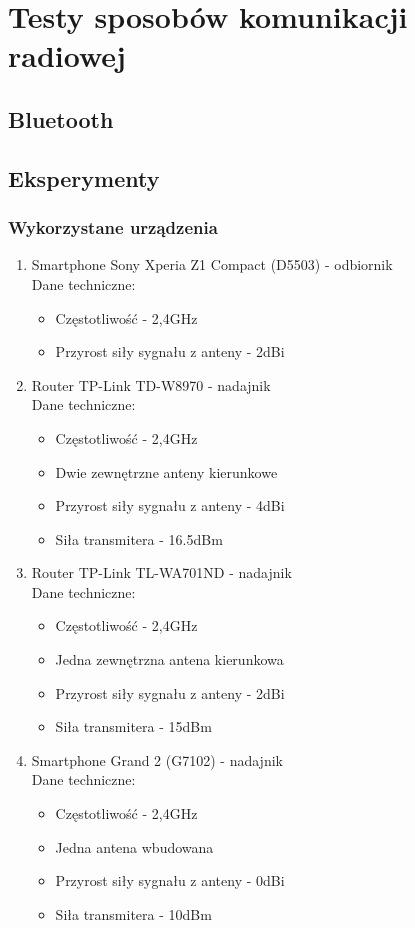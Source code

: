 \chapter{Testy sposobów komunikacji radiowej}
\label{cha:teoria}

\section{Bluetooth}
\section{Eksperymenty}
\subsection{Wykorzystane urządzenia}
\begin{enumerate}
	\item Smartphone Sony Xperia Z1 Compact (D5503) - odbiornik\\				
	Dane techniczne:
	\begin{itemize}
		\item Częstotliwość - 2,4GHz
		\item Przyrost siły sygnału z anteny - 2dBi
	\end{itemize}
	\item Router TP-Link TD-W8970 - nadajnik\\
	Dane techniczne:
	\begin{itemize}
		\item Częstotliwość - 2,4GHz
		\item Dwie zewnętrzne anteny kierunkowe
		\item Przyrost siły sygnału z anteny - 4dBi
		\item Siła transmitera - 16.5dBm					
	\end{itemize}
	\item Router TP-Link TL-WA701ND - nadajnik\\
	Dane techniczne:
	\begin{itemize}
		\item Częstotliwość - 2,4GHz
		\item Jedna zewnętrzna antena kierunkowa
		\item Przyrost siły sygnału z anteny - 2dBi
		\item Siła transmitera - 15dBm					
	\end{itemize}
	\item Smartphone Grand 2 (G7102) - nadajnik\\
	Dane techniczne:
	\begin{itemize}
		\item Częstotliwość - 2,4GHz
		\item Jedna antena wbudowana
		\item Przyrost siły sygnału z anteny - 0dBi
		\item Siła transmitera - 10dBm					
	\end{itemize}
\end{enumerate}

